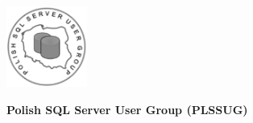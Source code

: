 \documentclass[\main/boa.tex]{subfiles}
\begin{document}
	
	\begin{minipage}[t]{0.915\textwidth}
		\center     
		\includegraphics[width=100px]{img/logos.bw/plssug.png} 
	\end{minipage}
	\begin{center}
	\Large \textbf {Polish SQL Server User Group (PLSSUG)}
	\end{center}
	
	\vskip 0.3cm
	\normalsize 

\vskip 1.5cm	
\end{document}
